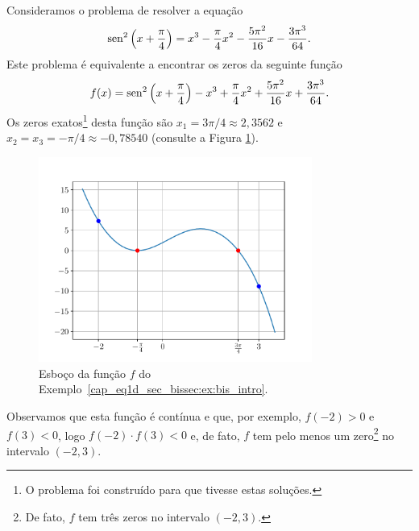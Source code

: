 \begin{ex}\label{cap_eq1d_sec_bissec:ex:bis_intro}
  Consideramos o problema de resolver a equação
  \begin{equation}
    \operatorname{sen}^2\left(x+\frac{\pi}{4}\right) = x^3 - \frac{\pi}{4}x^2 - \frac{5\pi^2}{16}x - \frac{3\pi^3}{64}.
  \end{equation}
Este problema é equivalente a encontrar os zeros da seguinte função
\begin{equation}
  f(x) = \operatorname{sen}^2\left(x+\frac{\pi}{4}\right) - x^3 + \frac{\pi}{4}x^2 + \frac{5\pi^2}{16}x + \frac{3\pi^3}{64}.
\end{equation}
Os zeros exatos\footnote{O problema foi construído para que tivesse estas soluções.} desta função são $x_1=3\pi/4\approx 2,3562$ e $x_2=x_3=-\pi/4\approx -0,78540$ (consulte a Figura \ref{cap_eq1d_sec_bissec:fig:bis_intro}).

\begin{figure}[H]
  \centering
  \includegraphics[width=0.8\textwidth]{./cap_eq1d/dados/fig_bis_intro/fig}
  \caption{Esboço da função $f$ do Exemplo~\ref{cap_eq1d_sec_bissec:ex:bis_intro}.}
  \label{cap_eq1d_sec_bissec:fig:bis_intro}
\end{figure}

Observamos que esta função é contínua e que, por exemplo, $f(-2)>0$ e $f(3)<0$, logo $f(-2)\cdot f(3) < 0$ e, de fato, $f$ tem pelo menos um zero\footnote{De fato, $f$ tem três zeros no intervalo $(-2, 3)$.} no intervalo $(-2, 3)$.
\end{ex}

